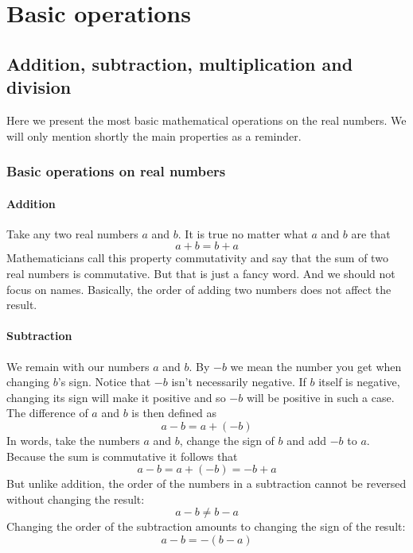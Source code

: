 \chapter{Basic operations}

\section{Addition, subtraction, multiplication and division}

\noindent Here we present the most basic mathematical operations on the real numbers. We will only mention shortly the main properties as a reminder.

\subsection{Basic operations on real numbers}

\subsubsection{Addition}

\noindent Take any two real numbers $a$ and $b$. It is true no matter what $a$ and $b$ are that
$$
a + b = b + a
$$
Mathematicians call this property commutativity and say that the sum of two real numbers is commutative. But that is just a fancy word. And we should not focus on names. Basically, the order of adding two numbers does not affect the result.

\subsubsection{Subtraction}

\noindent We remain with our numbers $a$ and $b$. By $-b$ we mean the number you get when changing $b$'s sign. Notice that $-b$ isn't necessarily negative. If $b$ itself is negative, changing its sign will make it positive and so $-b$ will be positive in such a case.\\

\noindent The difference of $a$ and $b$ is then defined as
$$
a - b = a + (-b)
$$
In words, take the numbers $a$ and $b$, change the sign of $b$ and add $-b$ to $a$.\\

\noindent Because the sum is commutative it follows that
$$
a - b = a + (-b) = -b + a
$$
But unlike addition, the order of the numbers in a subtraction cannot be reversed without changing the result:
$$
a - b \neq b - a
$$
Changing the order of the subtraction amounts to changing the sign of the result:
$$
a - b = -(b-a)
$$

